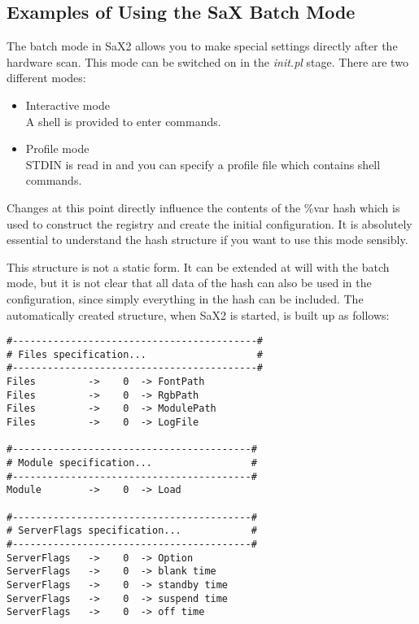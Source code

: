 \begin{appendix}
\chapter{Examples of Using the SaX Batch Mode}
The batch mode in SaX2 allows you to make special settings directly after the 
hardware scan. This mode can be switched on in the \textit{init.pl}
stage. There are two different modes:\\
\begin{itemize}
\item Interactive mode\\
      A shell is provided to enter commands.
\item Profile mode\\
      STDIN is read in and you can specify a profile file which contains shell
      commands.
\end{itemize}
Changes at this point directly influence the contents of the 
\%var hash which is used to construct the registry and create the initial
configuration. It is absolutely essential to understand the hash structure if
you want to use this mode sensibly. 

This structure is not a static form. It can be extended at will with the batch
mode, but it is not clear that all data of the hash can also be used in the
configuration, since simply everything in the hash can be included. The
automatically created structure, when SaX2 is started, is built up as follows:
\\
\begin{verbatim}
#------------------------------------------#
# Files specification...                   #
#------------------------------------------#
Files         ->    0  -> FontPath
Files         ->    0  -> RgbPath
Files         ->    0  -> ModulePath
Files         ->    0  -> LogFile

#-----------------------------------------#
# Module specification...                 #
#-----------------------------------------#
Module        ->    0  -> Load

#-----------------------------------------#
# ServerFlags specification...            #
#-----------------------------------------#
ServerFlags   ->    0  -> Option
ServerFlags   ->    0  -> blank time
ServerFlags   ->    0  -> standby time
ServerFlags   ->    0  -> suspend time
ServerFlags   ->    0  -> off time


\end{verbatim}
\end{appendix}
